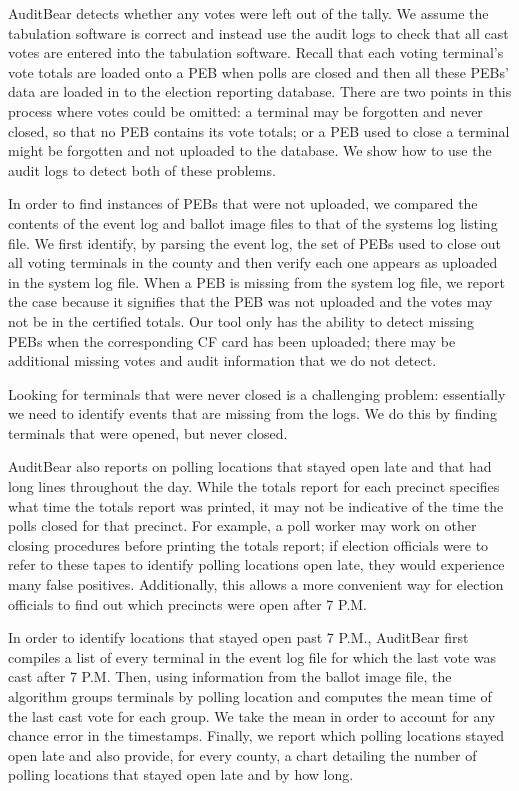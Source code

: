 \documentclass[letterpaper,twocolumn,10pt]{article}
\begin{document}
AuditBear detects whether any votes were left out of the tally. We assume the
tabulation software is correct and instead use the audit logs to check that all
cast votes are entered into the tabulation software. Recall that each voting
terminal's vote totals are loaded onto a PEB when polls are closed and then all
these PEBs' data are loaded in to the election reporting database. There are two
points in this process where votes could be omitted: a terminal may be forgotten
and never closed, so that no PEB contains its vote totals; or a PEB used to
close a terminal might be forgotten and not uploaded to the database. We show
how to use the audit logs to detect both of these problems.  

In order to find instances of PEBs that were not uploaded, we
compared the contents of the event log and ballot image files to that of the
systems log listing file. We first identify, by parsing the event log, the set
of PEBs used to close out all voting terminals in the county and then verify each one appears as
uploaded in the system log file. When a PEB is missing from the system log file,
we report the case because it signifies that the PEB was not uploaded and the
votes may not be in the certified totals. Our tool only has the ability to detect missing 
PEBs when the corresponding CF card has been uploaded; there may be additional missing 
votes and audit information that we do not detect.

Looking for terminals that were never closed is a challenging problem:
essentially we need to identify events that are missing from the logs. We do
this by finding terminals that were opened, but never closed.  

AuditBear also reports on polling locations that stayed open late and that had
long lines throughout the day. While the totals report for each precinct specifies 
what time the totals report was printed, it may not be indicative of the time  
the polls closed for that precinct. For example, a poll worker may work on other 
closing procedures before printing the totals report; if election officials were to 
refer to these tapes to identify polling locations open late, they would 
experience many false positives. Additionally, this allows a more convenient way for 
election officials to find out which precincts were open after 7 P.M. 

In order to 
identify locations that stayed open past 7
P.M., AuditBear first compiles a list of every terminal in the event log file
for which the last vote was cast after 7 P.M. Then, using information from the
ballot image file, the algorithm groups terminals by polling location and
computes the mean time of the last cast vote for each group. We take the mean in
order to account for any chance error in the timestamps. Finally, we report which
polling locations stayed open late and also provide, for every county, a chart
detailing the number of polling locations that stayed open late and by how
long. 
	 		
\end{document}

